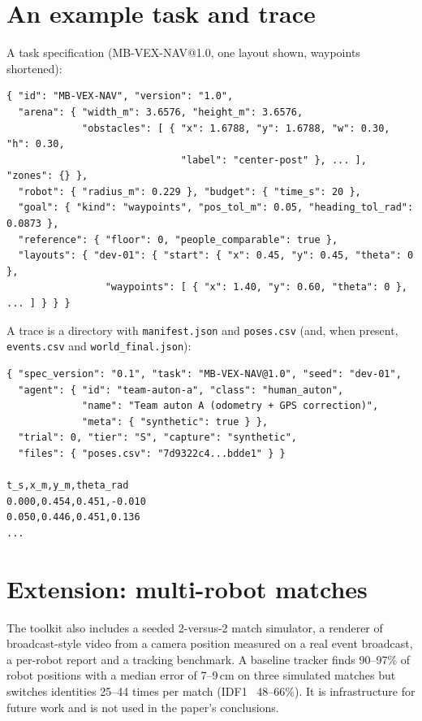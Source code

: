 \documentclass[11pt]{article}
\begin{document}
\section{An example task and trace}\label{app:example}
\small
A task specification (MB-VEX-NAV@1.0, one layout shown, waypoints shortened):
\begin{verbatim}
{ "id": "MB-VEX-NAV", "version": "1.0",
  "arena": { "width_m": 3.6576, "height_m": 3.6576,
             "obstacles": [ { "x": 1.6788, "y": 1.6788, "w": 0.30, "h": 0.30,
                              "label": "center-post" }, ... ], "zones": {} },
  "robot": { "radius_m": 0.229 }, "budget": { "time_s": 20 },
  "goal": { "kind": "waypoints", "pos_tol_m": 0.05, "heading_tol_rad": 0.0873 },
  "reference": { "floor": 0, "people_comparable": true },
  "layouts": { "dev-01": { "start": { "x": 0.45, "y": 0.45, "theta": 0 },
                 "waypoints": [ { "x": 1.40, "y": 0.60, "theta": 0 }, ... ] } } }
\end{verbatim}
A trace is a directory with \texttt{manifest.json} and \texttt{poses.csv} (and, when present,
\texttt{events.csv} and \texttt{world\_final.json}):
\begin{verbatim}
{ "spec_version": "0.1", "task": "MB-VEX-NAV@1.0", "seed": "dev-01",
  "agent": { "id": "team-auton-a", "class": "human_auton",
             "name": "Team auton A (odometry + GPS correction)",
             "meta": { "synthetic": true } },
  "trial": 0, "tier": "S", "capture": "synthetic",
  "files": { "poses.csv": "7d9322c4...bdde1" } }

t_s,x_m,y_m,theta_rad
0.000,0.454,0.451,-0.010
0.050,0.446,0.451,0.136
...
\end{verbatim}
\normalsize

\section{Extension: multi-robot matches}\label{app:matches}

The toolkit also includes a seeded 2-versus-2 match simulator, a renderer of broadcast-style video
from a camera position measured on a real event broadcast, a per-robot report and a tracking
benchmark. A baseline tracker finds 90--97\% of robot positions with a median error of 7--9\,cm on
three simulated matches but switches identities 25--44 times per match (IDF1~\cite{ristani2016}
48--66\%). It is infrastructure for future work and is not used in the paper's conclusions.
\end{document}
